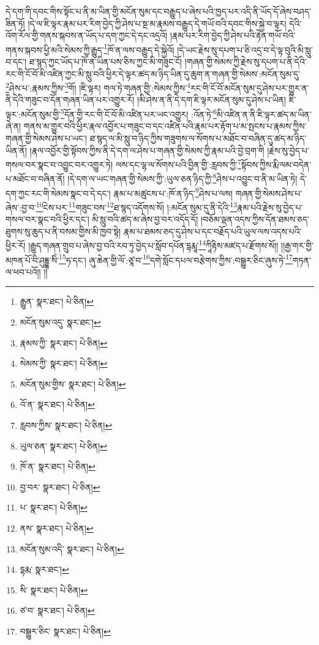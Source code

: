 དེ་དག་གི་དབང་གིས་སྟོང་པ་ནི་མ་ཡིན་གྱི་མངོན་སུམ་དང་བརྒྱུད་པ་ཞེས་པའི་ཁྱད་པར་འདི་ནི་ཡོད་དོ་ཞེས་བཤད་ཟིན་ཏོ། །དེ་ལ་ཇི་ལྟར་རྣམ་པར་རིག་བྱེད་ཀྱི་ཤེས་པ་སྔ་མ་རྣམས་བརྒྱུད་དེ་གཡོ་བའི་དབང་གིས་སྐྱེ་བ་ལྟར། དེའི་འོག་རོལ་གྱི་གནས་སྐབས་ན་ཡོད་པ་དག་ཀྱང་དེ་དང་འདྲའོ། །རྣམ་པར་རིག་བྱེད་ཀྱི་ཤེས་པའི་རྟེན་གཡོ་བའི་གནས་སྐབས་ཕྱི་མའི་སེམས་ཀྱི་རྒྱུད་\footnote{རྒྱུན་  སྣར་ཐང་།  པེ་ཅིན། }ཁོ་ན་ལས་བརྒྱུད་དེ་སྐྱེའོ། །དེ་ཡང་རྗེས་སུ་དཔག་པ་ཅི་འདྲ་བ་དེ་ལྟ་བུའི་མི་སླུ་བ་དང་། ཐ་སྙད་ཀྱང་ཡོད་པ་ཁོ་ན་ཡིན་པས་ཅིས་ཀྱང་མི་གཟུང་ངོ། །གཞན་གྱི་སེམས་ཀྱི་རྗེས་སུ་དཔག་པ་ནི་དེའི་རང་གི་ངོ་བོ་མི་འཛིན་ཀྱང་མི་སླུ་བའི་ཕྱིར་དེ་ལྟར་ཚད་མ་ཉིད་ཡིན་དུ་ཆུག་ན་གཞན་གྱི་སེམས་:མངོན་སུམ་དུ་\footnote{མངོན་སུམ་འདུ་  སྣར་ཐང་། }ཤེས་པ་:རྣམས་ཀྱིས་\footnote{རྣམས་ཀྱི་  སྣར་ཐང་།  པེ་ཅིན། }གོ། །ཇི་ལྟར། གལ་ཏེ་གཞན་གྱི་:སེམས་ཀྱིས་\footnote{སེམས་ཀྱི་  སྣར་ཐང་།  པེ་ཅིན། }རང་གི་ངོ་བོ་མངོན་སུམ་དུ་ཤེས་པར་གྱུར་ན་ནི་དེའི་གཟུང་བ་དོན་གཞན་ཡིན་པར་འགྱུར་རོ། །མི་ཤེས་ན་ནི་དེ་དག་ཇི་ལྟར་མངོན་སུམ་དུ་ཤེས་པ་ཡིན། ཇི་ལྟར་:མངོན་སུམ་གྱི་\footnote{མངོན་སུམ་གྱིས་  སྣར་ཐང་།  པེ་ཅིན། }དོན་གྱི་རང་གི་ངོ་བོ་མི་འཛིན་པར་ཡང་འགྱུར། :འོན་ཏེ་\footnote{འོ་ན་  སྣར་ཐང་།  པེ་ཅིན། }མི་འཛིན་ན་ནི་ཇི་ལྟར་ཚད་མ་ཡིན་ཞེ་ན། གནས་མ་གྱུར་བའི་ཕྱིར་རྣལ་འབྱོར་པ་གཟུང་བ་དང་འཛིན་པའི་རྣམ་པར་རྟོག་པ་མ་སྤངས་པ་རྣམས་ཀྱིས་གཞན་གྱི་སེམས་ཤེས་པ་ཡང་། ཐ་སྙད་ལ་མི་སླུ་བ་ཉིད་ཀྱིས་གཟུགས་ལ་སོགས་པ་མཐོང་བ་བཞིན་དུ་ཚད་མ་ཉིད་ཡིན་ནོ། །རྣལ་འབྱོར་གྱི་སྟོབས་ཀྱིས་ནི་དེ་དག་ལ་ཤེས་པ་གཞན་གྱི་སེམས་ཀྱི་རྣམ་པའི་བྱེ་བྲག་གི །རྗེས་སུ་བྱེད་པ་གསལ་བར་སྣང་བ་འབྱུང་བར་འགྱུར་ཏེ། ལས་དང་ལྷ་ལ་སོགས་པའི་བྱིན་གྱི་:རླབས་ཀྱི་\footnote{རླབས་ཀྱིས་  སྣར་ཐང་།  པེ་ཅིན། }སྟོབས་ཀྱིས་རྨི་ལམ་བདེན་པ་མཐོང་བ་བཞིན་ནོ། །དེ་དག་ལ་ཡང་གཞན་གྱི་སེམས་ཀྱི་:ཡུལ་ཅན་ཉིད་ཀྱི་\footnote{ཡུལ་ཅན་  སྣར་ཐང་།  པེ་ཅིན། }ཤེས་པ་འབྱུང་བ་ནི་མ་ཡིན་ཏེ། དེ་དག་ཀྱང་རང་གི་སེམས་སྣང་བ་དེ་དང་། རྣམ་པ་མཚུངས་པ་:ཁོ་ན་ཉིད་\footnote{ཁོ་ན་  སྣར་ཐང་།  པེ་ཅིན། }ཤེས་པ་ལས། གཞན་གྱི་སེམས་ཤེས་པ་ཞེས་:བྱ་བ་\footnote{བྱ་བར་  སྣར་ཐང་།  པེ་ཅིན། }ངེས་པར་\footnote{པ་  སྣར་ཐང་།  པེ་ཅིན། }གཟུང་བས་\footnote{ནས་  སྣར་ཐང་།  པེ་ཅིན། }ཐ་སྙད་འདོགས་སོ། །:མངོན་སུམ་དུ་ནི་དེའི་\footnote{མངོན་སུམ་འདི་  སྣར་ཐང་།  པེ་ཅིན། }རྣམ་པའི་རྗེས་སུ་བྱེད་པ་གསལ་བར་སྣང་བའི་ཕྱིར་དང་། མི་སླུ་བའི་ཚད་མ་ཞེས་བྱ་བར་འདོད་དོ། །བཅོམ་ལྡན་འདས་ཀྱིས་དོན་ཐམས་ཅད་ཐུགས་སུ་ཆུད་པ་ནི་བསམ་གྱིས་མི་ཁྱབ་སྟེ། རྣམ་པ་ཐམས་ཅད་དུ་ཤེས་པ་དང་བརྗོད་པའི་ཡུལ་ལས་འདས་པའི་ཕྱིར་རོ། །རྒྱུད་གཞན་གྲུབ་པ་ཞེས་བྱ་བའི་རབ་ཏུ་བྱེད་པ་སློབ་དཔོན་དྷརྨཱ་\footnote{དྷརྨ་  སྣར་ཐང་། }ཀཱིརྟིས་མཛད་པ་རྫོགས་སོ།། །།རྒྱ་གར་གྱི་མཁན་པོ་བི་ཤུདྡྷ་སིཾ་\footnote{སི་  སྣར་ཐང་།  པེ་ཅིན། }ཧ་དང་། ཞུ་ཆེན་གྱི་ལོ་:ཙཱ་བ་\footnote{ཙ་བ་  སྣར་ཐང་།  པེ་ཅིན། }དགེ་སློང་དཔལ་བརྩེགས་ཀྱིས་:བསྒྱུར་ཅིང་ཞུས་ཏེ་\footnote{བསྒྱུར་ཅིང་  སྣར་ཐང་།  པེ་ཅིན། }གཏན་ལ་ཕབ་པའོ།། །།